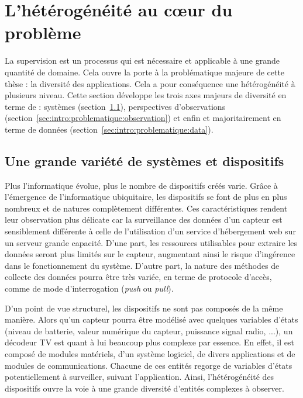 \section{L'hétérogénéité au cœur du problème}\label{sec:intro:problematique}
La supervision est un processus qui est nécessaire et applicable à une grande quantité de domaine. Cela ouvre la porte à la problématique majeure de cette thèse : la diversité des applications. Cela a pour conséquence une hétérogénéité à plusieurs niveau. Cette section développe les trois axes majeurs de diversité en terme de : systèmes (section~\ref{sec:intro:problematique:devices}), perspectives d'observations (section~\ref{sec:intro:problematique:observation}) et enfin et majoritairement en terme de données (section~\ref{sec:intro:problematique:data}).

\subsection{Une grande variété de systèmes et dispositifs}\label{sec:intro:problematique:devices}
Plus l'informatique évolue, plus le nombre de dispositifs créés varie. Grâce à l'émergence de l'informatique ubiquitaire, les dispositifs se font de plus en plus nombreux et de natures complètement différentes. Ces caractéristiques rendent leur observation plus délicate car la surveillance des données d'un capteur est sensiblement différente à celle de l'utilisation d'un service d'hébergement web sur un serveur grande capacité. D'une part, les ressources utilisables pour extraire les données seront plus limités sur le capteur, augmentant ainsi le risque d'ingérence dans le fonctionnement du système. D'autre part, la nature des méthodes de collecte des données pourra être très variée, en terme de protocole d'accès, comme de mode d'interrogation (\textit{push} ou \textit{pull}).

D'un point de vue structurel, les dispositifs ne sont pas composés de la même manière. Alors qu'un capteur pourra être modélisé avec quelques variables d'états (niveau de batterie, valeur numérique du capteur, puissance signal radio, ...), un décodeur TV est quant à lui beaucoup plus complexe par essence. En effet, il est composé de modules matériels, d'un système logiciel, de divers applications et de modules de communications. Chacune de ces entités regorge de variables d'états potentiellement à surveiller, suivant l'application. Ainsi, l'hétérogénéité des dispositifs ouvre la voie à une grande diversité d'entités complexes à observer.

